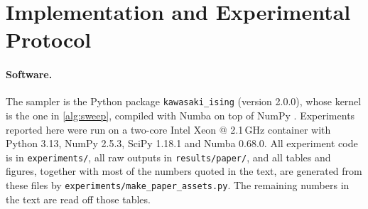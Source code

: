 \section{Implementation and Experimental Protocol}
\label{sec:protocol}

\paragraph{Software.} The sampler is the Python package \texttt{kawasaki\_ising} (version 2.0.0), whose kernel is the one in \cref{alg:sweep}, compiled with Numba \citep{lam2015} on top of NumPy \citep{harris2020}. Experiments reported here were run on a two-core Intel Xeon @ 2.1\,GHz container with Python 3.13, NumPy 2.5.3, SciPy 1.18.1 and Numba 0.68.0. All experiment code is in \texttt{experiments/}, all raw outputs in \texttt{results/paper/}, and all tables and figures, together with most of the numbers quoted in the text, are generated from these files by \texttt{experiments/make\_paper\_assets.py}. The remaining numbers in the text are read off those tables.

